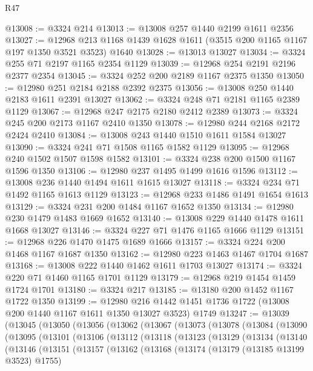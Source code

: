 \begin{lexlean}{R47}
\begin{coremodule}
@13008 := @3324 @214
@13013 := @13008 @257 @1440 @2199 @1611 @2356
@13027 := @12968 @213 @1168 @1439 @1628 @1611 (@3515 @200 @1165 @1167 @197 @1350 @3521 @3523) @1640
@13028 := @13013 @13027
@13034 := @3324 @255 @71 @2197 @1165 @2354 @1129
@13039 := @12968 @254 @2191 @2196 @2377 @2354
@13045 := @3324 @252 @200 @2189 @1167 @2375 @1350
@13050 := @12980 @251 @2184 @2188 @2392 @2375
@13056 := @13008 @250 @1440 @2183 @1611 @2391 @13027
@13062 := @3324 @248 @71 @2181 @1165 @2389 @1129
@13067 := @12968 @247 @2175 @2180 @2412 @2389
@13073 := @3324 @245 @200 @2173 @1167 @2410 @1350
@13078 := @12980 @244 @2168 @2172 @2424 @2410
@13084 := @13008 @243 @1440 @1510 @1611 @1584 @13027
@13090 := @3324 @241 @71 @1508 @1165 @1582 @1129
@13095 := @12968 @240 @1502 @1507 @1598 @1582
@13101 := @3324 @238 @200 @1500 @1167 @1596 @1350
@13106 := @12980 @237 @1495 @1499 @1616 @1596
@13112 := @13008 @236 @1440 @1494 @1611 @1615 @13027
@13118 := @3324 @234 @71 @1492 @1165 @1613 @1129
@13123 := @12968 @233 @1486 @1491 @1654 @1613
@13129 := @3324 @231 @200 @1484 @1167 @1652 @1350
@13134 := @12980 @230 @1479 @1483 @1669 @1652
@13140 := @13008 @229 @1440 @1478 @1611 @1668 @13027
@13146 := @3324 @227 @71 @1476 @1165 @1666 @1129
@13151 := @12968 @226 @1470 @1475 @1689 @1666
@13157 := @3324 @224 @200 @1468 @1167 @1687 @1350
@13162 := @12980 @223 @1463 @1467 @1704 @1687
@13168 := @13008 @222 @1440 @1462 @1611 @1703 @13027
@13174 := @3324 @220 @71 @1460 @1165 @1701 @1129
@13179 := @12968 @219 @1454 @1459 @1724 @1701
@13180 := @3324 @217
@13185 := @13180 @200 @1452 @1167 @1722 @1350
@13199 := @12980
    @216
    @1442
    @1451
    @1736
    @1722
    (@13008 @200 @1440 @1167 @1611 @1350 @13027 @3523)
    @1749
@13247 := @13039
    (@13045
      (@13050
        (@13056
          (@13062
            (@13067
              (@13073
                (@13078
                  (@13084
                    (@13090
                      (@13095
                        (@13101
                          (@13106
                            (@13112
                              (@13118
                                (@13123
                                  (@13129
                                    (@13134
                                      (@13140
                                        (@13146
                                          (@13151
                                            (@13157
                                              (@13162
                                                (@13168
                                                  (@13174
                                                    (@13179 (@13185 @13199 @3523) @1755)

\end{coremodule}
\end{lexlean}
